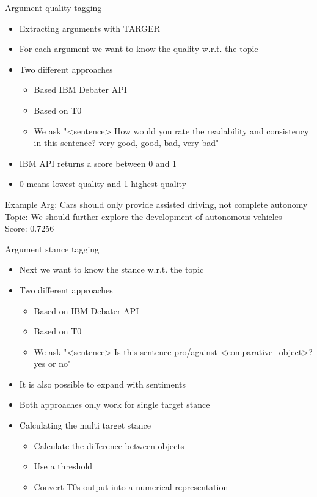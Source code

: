 \documentclass[english]{mlutalk}
\begin{document}
\begin{frame}{Argument quality tagging}
    \begin{itemize}
        \item Extracting arguments with TARGER~\cite{ChernodubOHBHBP2019}
        \item For each argument we want to know the quality w.r.t. the topic
        \item Two different approaches
        \begin{itemize}
            \item Based IBM Debater API~\cite{ToledoG2019}
            \item Based on T0
            \item We ask "<sentence>
            How would you rate the readability and consistency in this sentence? very good, good, bad, very bad"
        \end{itemize}
        \item IBM API returns a score between 0 and 1
        \item 0 means lowest quality and 1 highest quality
    \end{itemize}
    \begin{block}{Example}
        Arg: Cars should only provide assisted driving, not complete autonomy\\
        Topic: We should further explore the development of autonomous vehicles\\
        Score: 0.7256
    \end{block}
\end{frame}

\begin{frame}{Argument stance tagging}
    \begin{itemize}
        \item Next we want to know the stance w.r.t. the topic
        \item Two different approaches
        \begin{itemize}
            \item Based on IBM Debater API~\cite{BarHaimBDSS2017}
            \item Based on T0
            \item We ask "<sentence> Is this sentence pro/against <comparative\_object>? yes or no"
        \end{itemize}
        \item It is also possible to expand with sentiments
        \item Both approaches only work for single target stance
        \item Calculating the multi target stance
        \begin{itemize}
            \item Calculate the difference between objects
            \item Use a threshold
            \item Convert T0s output into a numerical representation
        \end{itemize}
    \end{itemize}
\end{frame}
\end{document}
